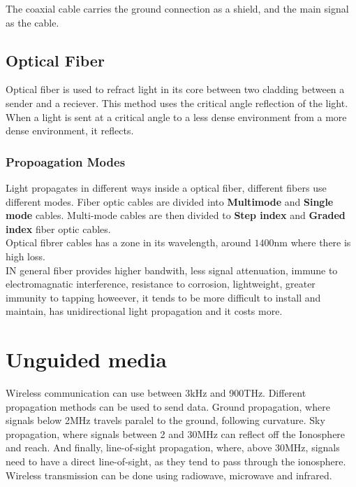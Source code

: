 \documentclass[11pt,a4paper,twoside]{book}
\begin{document}
The coaxial cable carries the ground connection as a shield, and the main signal as  the cable.

\subsection{Optical Fiber}

Optical fiber is used to refract light in its core between two cladding between a sender and a reciever. This method uses the critical angle reflection of the light. When a light is sent at a critical angle to a less dense environment from a more dense environment, it reflects.

\subsubsection{Propoagation Modes}

Light propagates in different ways inside a optical fiber, different fibers use different modes. Fiber optic cables are divided into \textbf{Multimode} and \textbf{Single mode} cables. Multi-mode cables are then divided to \textbf{Step index} and \textbf{Graded index} fiber optic cables.\\

Optical fibrer cables has a zone in its wavelength, around $1400$nm where there is high loss.\\

IN general fiber provides higher bandwith, less signal attenuation, immune to electromagnatic interference, resistance to corrosion, lightweight, greater immunity to tapping howeever, it tends to be more difficult to install and maintain, has unidirectional light propagation and it costs more.

\section{Unguided media}

Wireless communication can use between 3kHz and 900THz. Different propagation methods can be used to send data. Ground propagation, where signals below 2MHz travels paralel to the ground, following curvature. Sky propagation, where signals between 2 and 30MHz can reflect off the Ionosphere and reach. And finally, line-of-sight propagation, where, above 30MHz, signals need to have a direct line-of-sight, as they tend to pass through the ionosphere.\\

Wireless transmission can be done using radiowave, microwave and infrared.\\
\end{document}
